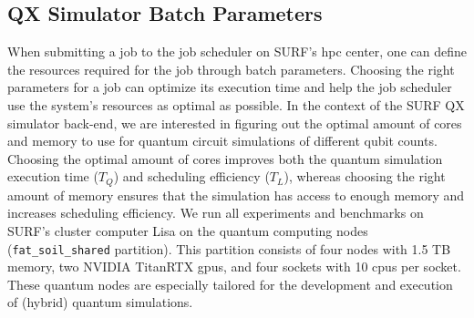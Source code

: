 \subsection{QX Simulator Batch Parameters}
When submitting a job to the job scheduler on SURF's \gls{hpc} center, one can define the resources required for the job through batch parameters.
Choosing the right parameters for a job can optimize its execution time and help the job scheduler use the system's resources as optimal as possible.
In the context of the SURF QX simulator back-end, we are interested in figuring out the optimal amount of cores and memory to use for quantum circuit simulations of different qubit counts.
Choosing the optimal amount of cores improves both the quantum simulation execution time ($T_Q$) and scheduling efficiency ($T_L$), whereas choosing the right amount of memory ensures that the simulation has access to enough memory and increases scheduling efficiency.
We run all experiments and benchmarks on SURF's cluster computer Lisa on the quantum computing nodes (\texttt{fat_soil_shared} partition).
This partition consists of four nodes with 1.5 TB memory, two NVIDIA TitanRTX \glspl{gpu}, and four sockets with 10 \glspl{cpu} per socket.
These quantum nodes are especially tailored for the development and execution of (hybrid) quantum simulations.

